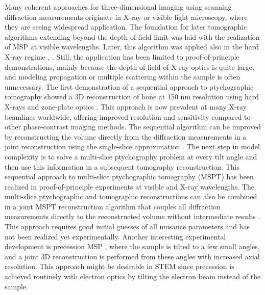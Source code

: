 \documentclass[12pt]{iopart}
\begin{document}
Many coherent approaches for three-dimensional imaging using scanning diffraction measurements originate in X-ray or visible light microscopy, where they are seeing widespread application. The foundation for later tomographic algorithms extending beyond the depth of field limit was laid with the realization of MSP \cite{maiden2012ptychographic} at visible wavelengths. Later, this algorithm was applied also in the hard X-ray regime \cite{Tsai_Sicairos_2016}, \cite{hu2022multi}. Still, the application has been limited to proof-of-principle demonstrations, mainly because the depth of field of X-ray optics is quite large, and modeling propagation or multiple scattering within the sample is often unnecessary. The first demonstration of a sequential approach to ptychographic tomography showed a 3D reconstruction of bone at 150 nm resolution using hard X-rays and zone-plate optics \cite{Dierolf_2010}. This approach is now prevalent at many X-ray beamlines worldwide, offering improved resolution and sensitivity compared to other phase-contrast imaging methods. The sequential algorithm can be improved by reconstructing the volume directly from the diffraction measurements in a joint reconstruction using the single-slice approximation \cite{Chang_Enfedaque_Marchesini_2019,kahnt2019coupled,aslan2019joint,nikitin2019photon}. The next step in model complexity is to solve a multi-slice ptychography problem at every tilt angle and then use this information in a subsequent tomography reconstruction. This sequential approach to multi-slice ptychographic tomography (MSPT) has been realized in proof-of-principle experiments at visible \cite{li2018multi} and X-ray \cite{kahnt2021multi} wavelengths. The multi-slice ptychographic and tomographic reconstructions can also be combined in a joint MSPT reconstruction algorithm that couples all diffraction measurements directly to the reconstructed volume without intermediate results \cite{Gilles_Nashed_Du_Jacobsen_Wild_2018,ozturk2018multi,jacobsen2018relaxation,huang2019resolving,Du_Nashed_Kandel_Gürsoy_Jacobsen_2020}. This approach requires good initial guesses of all nuisance parameters and has not been realized yet experimentally. Another interesting experimental development is precession MSP
\cite{Shimomura_Hirose_Takahashi_2018}, where the sample is tilted to a few small angles, and a joint 3D reconstruction is performed from these angles with increased axial resolution. This approach might be desirable in STEM since precession is achieved routinely with electron optics by tilting the electron beam instead of the sample.\\
\end{document}
